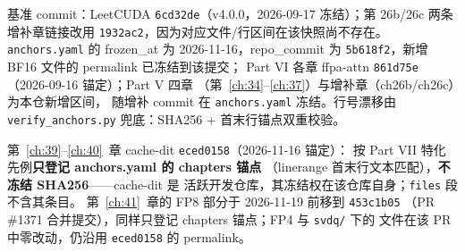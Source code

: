 基准 commit：LeetCUDA \texttt{6cd32de}（v4.0.0，2026-09-17 冻结）；第 26b/26c 两条增补章链接改用
\texttt{1932ac2}，因为对应文件/行区间在该快照尚不存在。\texttt{anchors.yaml} 的 frozen\_at 为 2026-11-16，repo\_commit 为 \texttt{5b618f2}，新增 BF16 文件的 permalink 已冻结到该提交；
Part VI 各章 ffpa-attn \texttt{861d75e}（2026-09-16 锚定）；Part V 四章
（第~\ref{ch:34}--\ref{ch:37}）与增补章（ch26b/ch26c）为本仓新增区间，
随增补 commit 在 \texttt{anchors.yaml} 冻结。行号漂移由
\texttt{verify\_\allowbreak{}anchors.\allowbreak{}py} 兜底：SHA256 + 首末行锚点双重校验。

第~\ref{ch:39}--\ref{ch:40}~章 cache-dit \texttt{eced0158}（2026-11-16 锚定）：
按 Part VII 特化先例\textbf{只登记 anchors.yaml 的 chapters 锚点}
（linerange 首末行文本匹配），\textbf{不冻结 SHA256}——cache-dit 是
活跃开发仓库，其冻结权在该仓库自身；\texttt{files} 段不含其条目。
第~\ref{ch:41}~章的 FP8 部分于 2026-11-19 前移到 \texttt{453c1b05}
（PR \#1371 合并提交），同样只登记 chapters 锚点；FP4 与 \texttt{svdq/} 下的
文件在该 PR 中零改动，仍沿用 \texttt{eced0158} 的 permalink。
